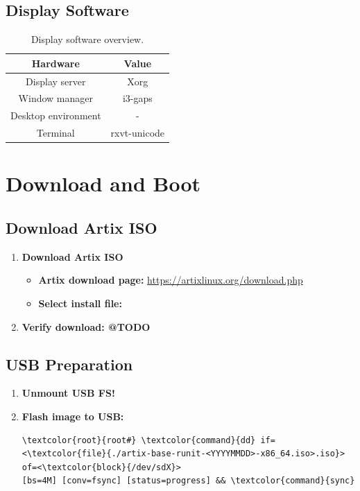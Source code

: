 \documentclass[10pt, a4paper, onecolumn, oneside, titlepage, openany]{book}
\begin{document}
\section{Display Software}
\begin{table}[h!]
\centering
\begin{tabular}{|c|c|}
    \hline
    \textbf{Hardware} & \textbf{Value} \\
    \hline
    Display server & Xorg\\
    Window manager & i3-gaps\\
    Desktop environment & -\\
    Terminal & rxvt-unicode\\
    \hline
\end{tabular}
\caption{Display software overview.}
\label{table:3}
\end{table}


\chapter{Download and Boot}
\section{Download Artix ISO}
\begin{enumerate}
    \item \textbf{Download Artix ISO}
    \begin{itemize}
        \item \textbf{Artix download page:}
\newline \url{https://artixlinux.org/download.php}
        \item \textbf{Select install file:}
\newline {}
    \end{itemize}
    \item \textbf{Verify download: @TODO}
\end{enumerate}

\section{USB Preparation}
\begin{enumerate}
    \item \textbf{Unmount USB FS!}
    \item \textbf{Flash image to USB:}
\begin{Verbatim}[commandchars=\\\{\}]
\textcolor{root}{root#} \textcolor{command}{dd} if=<\textcolor{file}{./artix-base-runit-<YYYYMMDD>-x86_64.iso>.iso}> of=<\textcolor{block}{/dev/sdX}>
[bs=4M] [conv=fsync] [status=progress] && \textcolor{command}{sync}
\end{Verbatim}
\end{enumerate}
\end{document}
